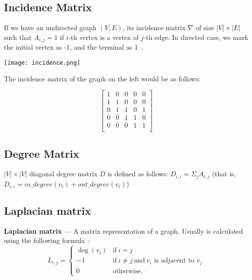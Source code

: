 \subsection*{Incidence Matrix}

    If we have an undirected graph $(V, E)$, its incidence matrix $\nabla$ of size $\lvert V \rvert \times \lvert E \rvert$ such that $A_{i, j} = 1$ if $i$-th vertex is a vertex of $j$-th edge.
    In directed case, we mark the initial vertex as -1, and the terminal as 1~\cite{wiki_incidence}.

    \begin{multicols}{2}
        \texttt{[image: incidence.png]}

        The incidence matrix of the graph on the left would be as follows:

        \[
        \begin{bmatrix}
            1 & 0 & 0 & 0 & 0\\
            1 & 1 & 0 & 0 & 0\\
            0 & 1 & 1 & 0 & 1\\
            0 & 0 & 1 & 1 & 0\\
            0 & 0 & 0 & 1 & 1\\
        \end{bmatrix}
        \]

    \end{multicols}


\subsection*{Degree Matrix}

    $\lvert V \rvert \times \lvert V \rvert$ diagonal degree matrix $D$ is defined as follows: $D_{i,i} = \Sigma_j A_{i, j}$ (that is, $D_{i, i} = in\_degree(v_i) + out\_degree(v_i)$)


\subsection*{Laplacian matrix}

    \textbf{Laplacian matrix} --- A matrix representation of a graph.
    Usually is calculated using the following formula~\cite{wiki_laplacian}:
    \begin{equation*}
        L_{i, j} = 
        \begin{cases}
            \deg(v_i) & \mbox{if}\ i = j \\
            -1 & \mbox{if}\ i \neq j\ \mbox{and}\ v_i \mbox{ is adjacent to } v_j \\
            0 & \mbox{otherwise},
    \end{cases}
    \end{equation*}

